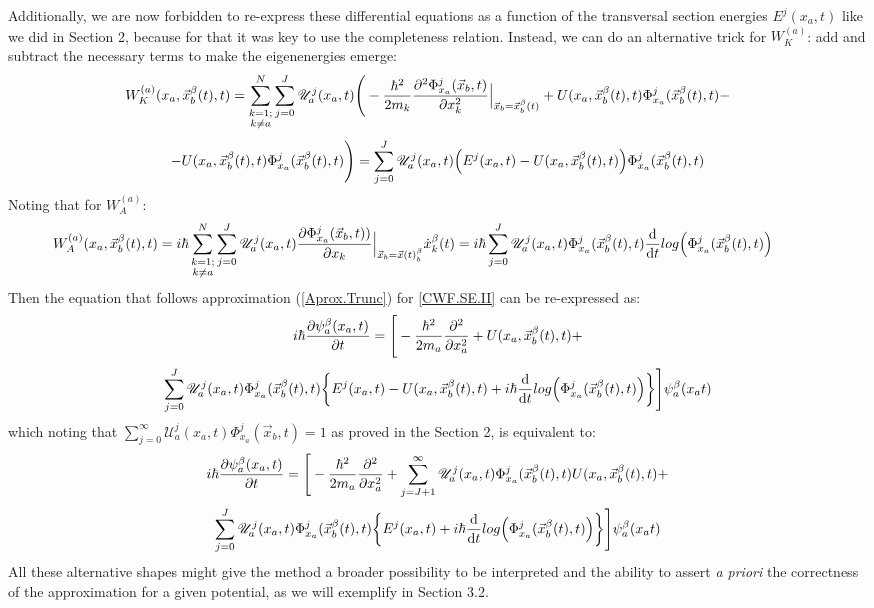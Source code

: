 \documentclass[11pt, a4paper]{article} %
\newcommand{\U}{\mathscr{U}}
\begin{document}
Additionally, we are now forbidden to re-express these differential equations as a function of the transversal section energies $E^j(x_a,t)$ like we did in Section 2, because for that it was key to use the completeness relation. Instead, we can do an alternative trick for $W^{(a)}_K$: add and subtract the necessary terms to make the eigenenergies emerge:
$$
\hspace{-0.5cm} W_K^{(a)}(x_a, \vec{x}_b^\beta (t),t)= \sum_{\substack{k=1; \\ k\neq a}}^{N} \sum_{j=0}^J \U^j_a(x_a,t) \Bigg( -\frac{\hbar^2}{2m_k} \pdv[2]{ \Phi_{x_a}^j(\vec{x}_b,t)}{x_k}\Big\rvert_{\vec{x}_b=\vec{x}_b^\beta(t)} +U(x_a, \vec{x}_b^\beta(t), t)\Phi_{x_a}^j(\vec{x}_b^\beta(t),t) -
$$
$$
- U(x_a, \vec{x}_b^\beta(t), t)\Phi_{x_a}^j(\vec{x}_b^\beta(t),t)\Bigg)=\sum_{j=0}^J \U^j_a(x_a,t)\qty( E^j(x_a,t)-U(x_a, \vec{x}_b^\beta(t), t)) \Phi^j_{x_a}(\vec{x}_b^\beta(t),t)
$$
Noting that for $W^{(a)}_A$:
$$
\hspace{-1.25cm}W_A^{(a)}(x_a, \vec{x}_b^\beta (t),t)=i\hbar\sum_{\substack{k=1; \\ k\neq a}}^{N} \sum_{j=0}^J \U^j_a(x_a,t) \pdv{ \Phi_{x_a}^j(\vec{x}_b,t))}{x_k}\Big\rvert_{\vec{x}_b=\vec{x}(t)_b^\beta} \dot{x}_k^\beta(t)=i\hbar\sum_{j=0}^J\U^j_a(x_a,t)\Phi_{x_a}^j(\vec{x}_b^\beta(t),t)\dv{}{t}log\qty(\Phi_{x_a}^j(\vec{x}_b^\beta(t),t))
$$
Then the equation that follows approximation (\ref{Aprox.Trunc}) for \ref{CWF.SE.II} can be re-expressed as:
$$
i\hbar \pdv{\psi_a^\beta(x_a, t)}{t} = \Bigg[- \frac{\hbar^2}{2m_a}\pdv[2]{}{x_a} + U(x_a, \vec{x}_b^\beta(t), t)+ 
$$
$$
\sum_{j=0}^J \U^j_a(x_a,t)\Phi^j_{x_a}(\vec{x}_b^\beta(t),t)\qty{ E^j(x_a,t)-U(x_a, \vec{x}_b^\beta(t), t) +i\hbar\dv{}{t}log\qty(\Phi_{x_a}^j(\vec{x}_b^\beta(t),t))}  \Bigg]\psi_a^\beta(x_a t)
$$
which noting that $\sum_{j=0}^\infty \U^j_a(x_a,t)\Phi^j_{x_a}(\vec{x}_b,t)=1$ as proved in the Section 2, is equivalent to:
$$
i\hbar \pdv{\psi_a^\beta(x_a, t)}{t} = \Bigg[- \frac{\hbar^2}{2m_a}\pdv[2]{}{x_a} + \sum_{j=J+1}^\infty \U^j_a(x_a,t)\Phi^j_{x_a}(\vec{x}_b^\beta(t),t)U(x_a, \vec{x}_b^\beta(t), t)+ 
$$
$$
\sum_{j=0}^J \U^j_a(x_a,t)\Phi^j_{x_a}(\vec{x}_b^\beta(t),t)\qty{ E^j(x_a,t)+i\hbar\dv{}{t}log\qty(\Phi_{x_a}^j(\vec{x}_b^\beta(t),t))}  \Bigg]\psi_a^\beta(x_a t)
$$
All these alternative shapes might give the method a broader possibility to be interpreted and the ability to assert {\em a priori} the correctness of the approximation for a given potential, as we will exemplify in Section 3.2.
\newpage
\end{document}
